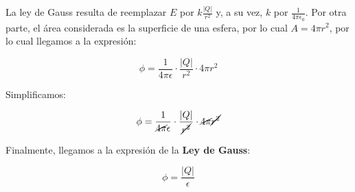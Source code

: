 La ley de Gauss resulta de reemplazar \(E\) por \(k\frac{|Q|}{r^{2}}\) y,
a su vez,
\(k\) por \(\frac{1}{4\pi\epsilon_0}\).
Por otra parte,
el área considerada es la superficie de una esfera,
por lo cual \(A = 4\pi r^{2}\),
por lo cual llegamos a la expresión:

\vspace{1cm}
\begin{equation*}
    \phi = \frac{1}{4\pi\epsilon} \cdot \frac{|Q|}{r^{2}} \cdot 4\pi r^{2}
\end{equation*}
\vspace{1cm}

Simplificamos:

\vspace{1cm}
\begin{equation*}
    \phi = \frac{1}{\cancel{4\pi}\epsilon} \cdot \frac{|Q|}{\cancel{r^{2}}} \cdot \cancel{4\pi} \cancel{r^{2}}
\end{equation*}
\vspace{1cm}

Finalmente, llegamos a la expresión de la \textbf{Ley de Gauss}:

\vspace{1cm}
\begin{equation}
    \phi = \frac{|Q|}{\epsilon}
\end{equation}
\vspace{1cm}